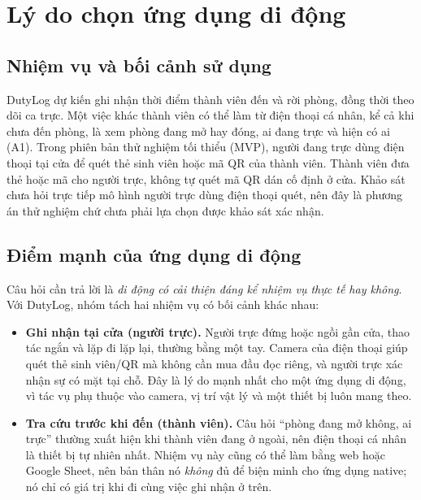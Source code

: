 \section{Lý do chọn ứng dụng di động}
\subsection{Nhiệm vụ và bối cảnh sử dụng}
DutyLog dự kiến ghi nhận thời điểm thành viên đến và rời phòng, đồng thời theo dõi ca trực. Một việc khác thành viên có thể làm từ điện thoại cá nhân, kể cả khi chưa đến phòng, là xem phòng đang mở hay đóng, ai đang trực và hiện có ai (A1). Trong phiên bản thử nghiệm tối thiểu (MVP), người đang trực dùng điện thoại tại cửa để quét thẻ sinh viên hoặc mã QR của thành viên. Thành viên đưa thẻ hoặc mã cho người trực, không tự quét mã QR dán cố định ở cửa. Khảo sát chưa hỏi trực tiếp mô hình người trực dùng điện thoại quét, nên đây là phương án thử nghiệm chứ chưa phải lựa chọn được khảo sát xác nhận.
\subsection{Điểm mạnh của ứng dụng di động}
Câu hỏi cần trả lời là \emph{di động có cải thiện đáng kể nhiệm vụ thực tế hay không}. Với DutyLog, nhóm tách hai nhiệm vụ có bối cảnh khác nhau:
\begin{itemize}[nosep]
\item \textbf{Ghi nhận tại cửa (người trực).} Người trực đứng hoặc ngồi gần cửa, thao tác ngắn và lặp đi lặp lại, thường bằng một tay. Camera của điện thoại giúp quét thẻ sinh viên/QR mà không cần mua đầu đọc riêng, và người trực xác nhận sự có mặt tại chỗ. Đây là lý do mạnh nhất cho một ứng dụng di động, vì tác vụ phụ thuộc vào camera, vị trí vật lý và một thiết bị luôn mang theo.
\item \textbf{Tra cứu trước khi đến (thành viên).} Câu hỏi ``phòng đang mở không, ai trực'' thường xuất hiện khi thành viên đang ở ngoài, nên điện thoại cá nhân là thiết bị tự nhiên nhất. Nhiệm vụ này cũng có thể làm bằng web hoặc Google Sheet, nên bản thân nó \emph{không} đủ để biện minh cho ứng dụng native; nó chỉ có giá trị khi đi cùng việc ghi nhận ở trên.
\end{itemize}

